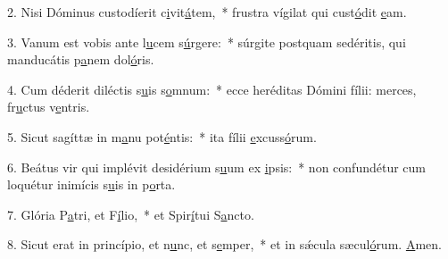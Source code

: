 2. Nisi Dóminus custodíerit c\uline{i}vit\uline{á}tem,~* frustra vígilat qui cust\uline{ó}dit \uline{e}am.\par 
3. Vanum est vobis ante l\uline{u}cem s\uline{ú}rgere:~* súrgite postquam sedéritis, qui manducátis p\uline{a}nem dol\uline{ó}ris.\par 
4. Cum déderit diléctis s\uline{u}is s\uline{o}mnum:~* ecce heréditas Dómini fílii: merces, fr\uline{u}ctus v\uline{e}ntris.\par 
5. Sicut sagíttæ in m\uline{a}nu pot\uline{é}ntis:~* ita fílii \uline{e}xcuss\uline{ó}rum.\par 
6. Beátus vir qui implévit desidérium s\uline{u}um ex \uline{i}psis:~* non confundétur cum loquétur inimícis s\uline{u}is in p\uline{o}rta.\par 
7. Glória P\uline{a}tri, et F\uline{í}lio,~* et Spir\uline{í}tui S\uline{a}ncto.\par 
8. Sicut erat in princípio, et n\uline{u}nc, et s\uline{e}mper,~* et in sǽcula sæcul\uline{ó}rum. \uline{A}men.\par 
